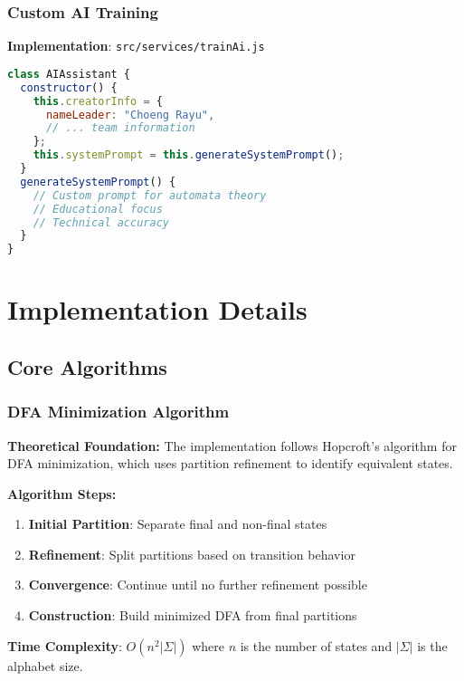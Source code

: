 \documentclass[12pt]{article}
\begin{document}
\subsubsection{Custom AI Training}
\textbf{Implementation}: \texttt{src/services/trainAi.js}
\begin{lstlisting}[language=JavaScript]
class AIAssistant {
  constructor() {
    this.creatorInfo = {
      nameLeader: "Choeng Rayu",
      // ... team information
    };
    this.systemPrompt = this.generateSystemPrompt();
  }
  generateSystemPrompt() {
    // Custom prompt for automata theory
    // Educational focus
    // Technical accuracy
  }
}
\end{lstlisting}

\section{Implementation Details}

\subsection{Core Algorithms}

\subsubsection{DFA Minimization Algorithm}
\textbf{Theoretical Foundation:} The implementation follows Hopcroft's algorithm for DFA minimization, which uses partition refinement to identify equivalent states.

\textbf{Algorithm Steps:}
\begin{enumerate}
    \item \textbf{Initial Partition}: Separate final and non-final states
    \item \textbf{Refinement}: Split partitions based on transition behavior
    \item \textbf{Convergence}: Continue until no further refinement possible
    \item \textbf{Construction}: Build minimized DFA from final partitions
\end{enumerate}

\textbf{Time Complexity}: $O(n^2|\Sigma|)$ where $n$ is the number of states and $|\Sigma|$ is the alphabet size.
\end{document}
